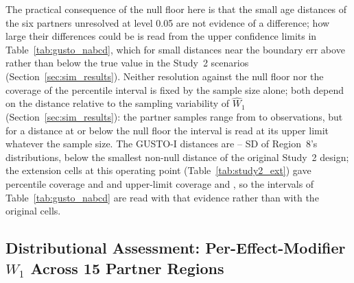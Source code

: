 \documentclass[AMA,Times1COL]{WileyNJDv5}
\begin{document}
The practical consequence of the null floor here is that the small age distances of the six partners unresolved at level 0.05 are not evidence of a difference; how large their differences could be is read from the upper confidence limits in Table~\ref{tab:gusto_nabcd}, which for small distances near the boundary err above rather than below the true value in the Study~2 scenarios (Section~\ref{sec:sim_results}). Neither resolution against the null floor nor the coverage of the percentile interval is fixed by the sample size alone; both depend on the distance relative to the sampling variability of $\widehat{W}_1$ (Section~\ref{sec:sim_results}): the partner samples range from  to  observations, but for a distance at or below the null floor the interval is read at its upper limit whatever the sample size. The GUSTO-I distances are -- SD of Region~8's distributions, below the smallest non-null distance of the original Study~2 design; the extension cells at this operating point (Table~\ref{tab:study2_ext}) gave percentile coverage  and  and upper-limit coverage  and , so the intervals of Table~\ref{tab:gusto_nabcd} are read with that evidence rather than with the original cells.

\subsection{Distributional Assessment: Per-Effect-Modifier $W_1$ Across 15 Partner Regions}\label{sec:app_nabcd}
\end{document}
